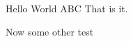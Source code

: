 \documentclass{article}
\begin{document}
Hello World
\gls{ABC}
That is it.


Now some other test
\end{document}

